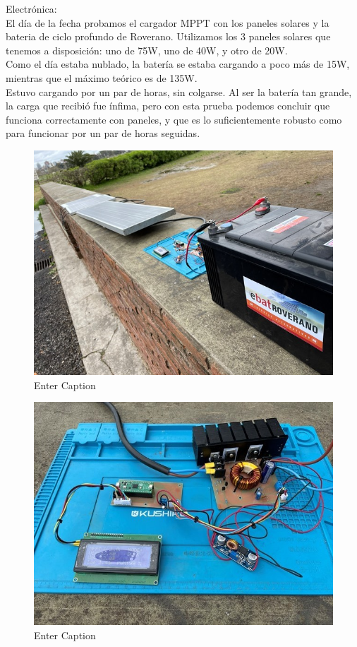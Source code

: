 Electrónica:\\

El día de la fecha probamos el cargador MPPT con los paneles solares y la bateria de ciclo profundo de Roverano. Utilizamos los 3 paneles solares que tenemos a disposición: uno de 75W, uno de 40W, y otro de 20W. \\

Como el día estaba nublado, la batería se estaba cargando a poco más de 15W, mientras que el máximo teórico es de 135W.\\

Estuvo cargando por un par de horas, sin colgarse. 
Al ser la batería tan grande, la carga que recibió fue ínfima, pero con esta prueba podemos concluir que funciona correctamente con paneles, y que es lo suficientemente robusto como para funcionar por un par de horas seguidas.\\

\begin{figure}[H]
    \centering
    \includegraphics[width=0.75\linewidth]{informes/IMG_8911.jpg}
    \caption{Enter Caption}
\end{figure}

\begin{figure}[H]
    \centering
    \includegraphics[width=0.75\linewidth]{informes/IMG_8912.jpg}
    \caption{Enter Caption}
\end{figure}

